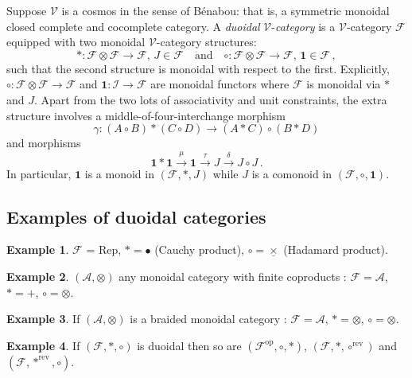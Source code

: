 \documentclass[a4paper,12pt]{article}
\theoremstyle{definition}
\newtheorem{example}{Example}[subsection]
\theoremstyle{fact}
\theoremstyle{genquest}
\theoremstyle{step}
\newcommand{\catI}{\mathbf{1}}
\newcommand{\catA}{\mathcal{A}}
\newcommand{\catF}{\mathcal{F}}
\newcommand{\scrI}{\mathcal{I}}
\newcommand{\catV}{\mathcal{V}}
\newcommand{\op}{\operatorname{op}}
\newcommand{\rev}{\operatorname{rev}}
\newcommand{\longto}{\longrightarrow}
\begin{document}
Suppose $\catV$ is a cosmos in the sense of B\'enabou: 
that is, a symmetric monoidal closed complete and cocomplete category.   
A \emph{duoidal} $\catV$-\emph{category} is a $\catV$-category $\catF$ equipped with two monoidal $\catV$-category structures:
 \[
 \ast  : \catF \otimes \catF \longto \catF \text{,  } J \in \catF
 \quad\text{and} \quad
  \circ : \catF \otimes \catF \longto \catF  \text{,  } \catI \in \catF\,,
 \]
 such that the second structure is monoidal with respect to the first.
 Explicitly, $\circ : \catF \otimes \catF \longto \catF$ and $\catI  : \scrI \longto \catF$ are monoidal functors 
 where $\catF$ is monoidal via $\ast$ and $J$. 
 Apart from the two lots of associativity and unit constraints, the extra structure involves a middle-of-four-interchange morphism
 \[
 \gamma : (A \circ B) \ast (C \circ D) \longto (A \ast C) \circ (B \ast D)
 \]
 and morphisms
\[
\catI \ast \catI \stackrel{\mu}{\longto} \catI \stackrel{\tau}{\longto} J \stackrel{\delta}{\longto} J \circ J\,.
\]
In particular, $\catI$ is a monoid in $(\catF,\ast,J)$ while $J$ is a comonoid in $(\catF,\circ,\catI)$.


\subsection{Examples of duoidal categories}

\begin{example}\label{DuoEx1}%
$\catF$ = Rep, $\ast = \bullet$ (Cauchy product), $\circ = \underline{\times}$ (Hadamard product).
\end{example} 

\begin{example}\label{DuoEx2}%
$(\catA, \otimes)$ any monoidal category  with finite coproducts : $\catF = \catA$, $\ast = +$, $\circ = \otimes$.
\end{example} 

\begin{example}\label{DuoEx3}%
If $(\catA, \otimes)$ is a braided monoidal category : $\catF = \catA$, $\ast = \otimes$, $\circ = \otimes$.
\end{example} 

\begin{example}\label{DuoEx4}%
If $(\catF,\ast,\circ)$ is duoidal then so are $(\catF^{\op},\circ,\ast)$, $(\catF,\ast,\circ^{\rev})$ and $(\catF,\ast^{\rev},\circ)$.
\end{example} 
\end{document}
